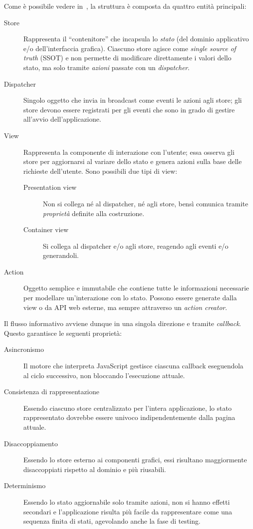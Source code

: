     Come è possibile vedere in~, la struttura è composta da quattro entità principali:
    \begin{description}
      \item[Store]
        Rappresenta il ``contenitore'' che incapsula lo \emph{stato} (del dominio applicativo e/o dell'interfaccia grafica).
        Ciascuno store agisce come \emph{single source of truth} (SSOT)
        e non permette di modificare direttamente i valori dello stato, ma solo tramite \emph{azioni} passate con un \emph{dispatcher}.
      \item[Dispatcher]
        Singolo oggetto che invia in broadcast come eventi le azioni agli store;
        gli store devono essere registrati per gli eventi che sono in grado di gestire all'avvio dell'applicazione.
      \item[View]
        Rappresenta la componente di interazione con l'utente;
        essa osserva gli store per aggiornarsi al variare dello stato e genera azioni sulla base delle richieste dell'utente.
        Sono possibili due tipi di view:
        \begin{description}
          \item[Presentation view] Non si collega né al dispatcher, né agli store, bensì comunica tramite \emph{proprietà} definite alla costruzione.
          \item[Container view] Si collega al dispatcher e/o agli store, reagendo agli eventi e/o generandoli.
        \end{description}
      \item[Action]
        Oggetto semplice e immutabile che contiene tutte le informazioni necessarie per modellare un'interazione con lo stato.
        Possono essere generate dalla view o da API web esterne, ma sempre attraverso un \emph{action creator}.
    \end{description}

    Il flusso informativo avviene dunque in una singola direzione e tramite \emph{callback}.
    Questo garantisce le seguenti proprietà:

    \begin{description}
      \item[Asincronismo]
        Il motore che interpreta JavaScript gestisce ciascuna callback eseguendola al ciclo successivo, non bloccando l'esecuzione attuale.
      \item[Consistenza di rappresentazione]
        Essendo ciascuno store centralizzato per l'intera applicazione, lo stato rappresentato dovrebbe essere univoco indipendentemente dalla pagina attuale.
      \item[Disaccoppiamento]
        Essendo lo store esterno ai componenti grafici, essi risultano maggiormente disaccoppiati rispetto al dominio e più riusabili.
      \item[Determinismo]
        Essendo lo stato aggiornabile solo tramite azioni, non si hanno effetti secondari e l'applicazione risulta più facile da rappresentare come una sequenza finita di stati, agevolando anche la fase di testing.
    \end{description}

